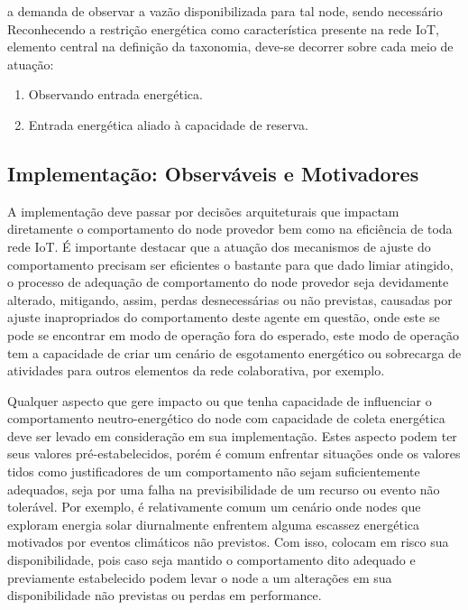 a demanda de observar a vazão disponibilizada para tal node, sendo necessário 
Reconhecendo a restrição energética como característica presente na rede \acs{IoT}, elemento central na definição da taxonomia, deve-se decorrer sobre cada meio de atuação:

\begin{enumerate}
	\item Observando entrada energética.
	\item Entrada energética aliado à capacidade de reserva.
\end{enumerate}




\subsection{Implementação: Observáveis e Motivadores}

A implementação deve passar por decisões arquiteturais que impactam diretamente o comportamento do node provedor bem como na eficiência de toda rede \acs{IoT}. É importante destacar que a atuação dos mecanismos de ajuste do comportamento precisam ser eficientes o bastante para que dado limiar atingido, o processo de adequação de comportamento do node provedor seja devidamente alterado, mitigando, assim, perdas desnecessárias ou não previstas, causadas por ajuste inapropriados do comportamento deste agente em questão, onde este se pode se encontrar em modo de operação fora do esperado, este modo de operação tem a capacidade de criar um cenário de esgotamento energético ou sobrecarga de atividades para outros elementos da rede colaborativa, por exemplo.

Qualquer aspecto que gere impacto ou que tenha capacidade de influenciar o comportamento neutro-energético do node com capacidade de coleta energética deve ser levado em consideração em sua implementação. Estes aspecto podem ter seus valores pré-estabelecidos, porém é comum enfrentar situações onde os valores tidos como justificadores de um comportamento não sejam suficientemente adequados, seja por uma falha na previsibilidade de um recurso ou evento não tolerável. Por exemplo, é relativamente comum um cenário onde nodes que exploram energia solar diurnalmente enfrentem alguma escassez energética motivados por eventos climáticos não previstos. Com isso, colocam em risco sua disponibilidade, pois caso seja mantido o comportamento dito adequado e previamente estabelecido podem levar o node a um alterações em sua disponibilidade não previstas ou perdas em performance. 

